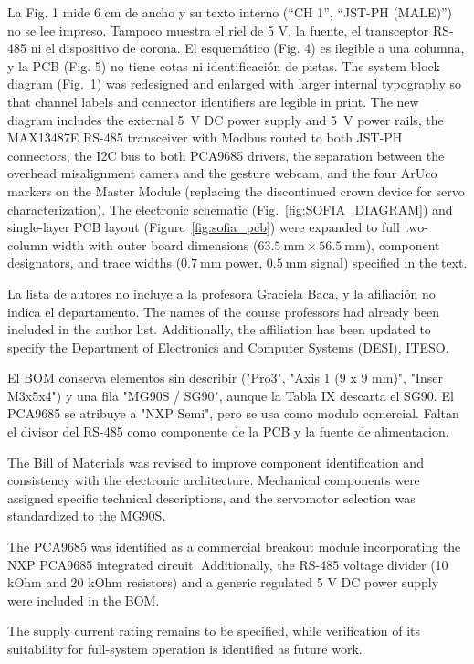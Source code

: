 \documentclass{LabDSTresponse}
\begin{document}
	{La Fig. 1 mide 6 cm de ancho y su texto interno (“CH 1”, “JST-PH (MALE)”) no se lee impreso. Tampoco muestra el riel
		de 5 V, la fuente, el transceptor RS-485 ni el dispositivo de corona. El esquemático (Fig. 4) es ilegible a una columna, y la
		PCB (Fig. 5) no tiene cotas ni identificación de pistas.}
	{The system block diagram (Fig.~1) was redesigned and enlarged with larger internal typography so that channel labels and connector identifiers are legible in print. The new diagram includes the external 5~V DC power supply and 5~V power rails, the MAX13487E RS-485 transceiver with Modbus routed to both JST-PH connectors, the I2C bus to both PCA9685 drivers, the separation between the overhead misalignment camera and the gesture webcam, and the four ArUco markers on the Master Module (replacing the discontinued crown device for servo characterization). The electronic schematic (Fig.~\ref{fig:SOFIA_DIAGRAM}) and single-layer PCB layout (Figure~\ref{fig:sofia_pcb}) were expanded to full two-column width with outer board dimensions ($63.5~\text{mm} \times 56.5~\text{mm}$), component designators, and trace widths ($0.7~\text{mm}$ power, $0.5~\text{mm}$ signal) specified in the text.}
	
	{La lista de autores no incluye a la profesora Graciela Baca, y la afiliación no indica el departamento.}
	{The names of the course professors had already been included in the author list. Additionally, the affiliation has been updated to specify the Department of Electronics and Computer Systems (DESI), ITESO.}
	
	
	{El BOM conserva elementos sin describir
		("Pro3", "Axis 1 (9 x 9 mm)",
		"Inser M3x5x4") y una fila "MG90S / SG90",
		aunque la Tabla IX descarta el SG90.
		El PCA9685 se atribuye a "NXP Semi",
		pero se usa como modulo comercial.
		Faltan el divisor del RS-485 como
		componente de la PCB y la fuente
		de alimentacion.}
	{The Bill of Materials was revised to
		improve component identification and
		consistency with the electronic architecture.
		Mechanical components were assigned
		specific technical descriptions, and the
		servomotor selection was standardized to
		the MG90S.
		
		The PCA9685 was identified as a commercial
		breakout module incorporating the NXP
		PCA9685 integrated circuit. Additionally,
		the RS-485 voltage divider (10 kOhm and
		20 kOhm resistors) and a generic regulated
		5 V DC power supply were included in the
		BOM.
		
		The supply current rating remains to be
		specified, while verification of its
		suitability for full-system operation
		is identified as future work.}
	
\end{document}
